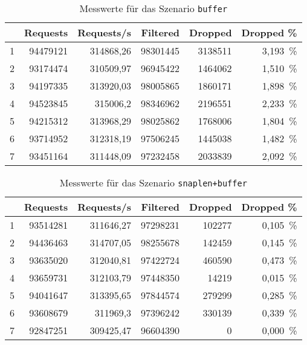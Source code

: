 \begin{table}[H]
  \centering
  \bgroup
  \def\arraystretch{1.2}
  \begin{tabular}{crrrrr}
      & \textbf{Requests} & \textbf{Requests/s} & \textbf{Filtered} & \textbf{Dropped} & \textbf{Dropped \%} \\\hline\hline
      1 & 94479121 & 314868,26 & 98301445 & 3138511 & 3,193~\%\\\hline
      2 & 93174474 & 310509,97 & 96945422 & 1464062 & 1,510~\%\\\hline
      3 & 94197335 & 313920,03 & 98005865 & 1860171 & 1,898~\%\\\hline
      4 & 94523845 & 315006,2 & 98346962 & 2196551 & 2,233~\%\\\hline
      5 & 94215312 & 313968,29 & 98025862 & 1768006 & 1,804~\%\\\hline
      6 & 93714952 & 312318,19 & 97506245 & 1445038 & 1,482~\%\\\hline
      7 & 93451164 & 311448,09 & 97232458 & 2033839 & 2,092~\%\\\hline
  \end{tabular}
  \egroup
  \caption{Messwerte für das Szenario \texttt{buffer}}\label{tab:messwerte-buffer}
\end{table}

\begin{table}[H]
  \centering
  \bgroup
  \def\arraystretch{1.2}
  \begin{tabular}{crrrrr}
      & \textbf{Requests} & \textbf{Requests/s} & \textbf{Filtered} & \textbf{Dropped} & \textbf{Dropped \%} \\\hline\hline
      1 & 93514281 & 311646,27 & 97298231 & 102277 & 0,105~\%\\\hline
      2 & 94436463 & 314707,05 & 98255678 & 142459 & 0,145~\%\\\hline
      3 & 93635020 & 312040,81 & 97422724 & 460590 & 0,473~\%\\\hline
      4 & 93659731 & 312103,79 & 97448350 & 14219 & 0,015~\%\\\hline
      5 & 94041647 & 313395,65 & 97844574 & 279299 & 0,285~\%\\\hline
      6 & 93608679 & 311969,3 & 97396242 & 330139 & 0,339~\%\\\hline
      7 & 92847251 & 309425,47 & 96604390 & 0 & 0,000~\%\\\hline
  \end{tabular}
  \egroup
  \caption{Messwerte für das Szenario \texttt{snaplen+buffer}}\label{tab:messwerte-snaplen-buffer}
\end{table}

